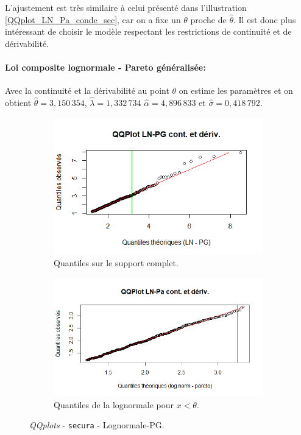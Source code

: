 		L'ajustement est très similaire à celui présenté dans l'illustration \ref{QQplot_LN_Pa_conde_sec}, car on a fixe un $\theta$ proche de $\hat{\theta}$. Il est donc plus intéressant de choisir le modèle respectant les restrictions de continuité et de dérivabilité.  	

		\paragraph{Loi composite lognormale - Pareto généralisée:} Avec la continuité et la dérivabilité au point $\theta$ on estime les paramètres et on obtient $\hat{\theta} =3,150\,354$, $\hat{\lambda}=1,332\,734$ $\hat{\alpha} =4,896\,833 $ et $\hat{\sigma}= 0,418\,792$.
		\begin{figure}[H]
			\begin{center}
				\begin{subfigure}[b]{0.45\textwidth}
					\includegraphics[scale=0.65]{Graphiques/QQ_LN_PG_condev_Secura} 
					\caption{Quantiles sur le support complet.} \label{QQplot_LN_PG_conde_Sec}
				\end{subfigure}
				\begin{subfigure}[b]{0.4\textwidth}
					\includegraphics[scale=0.65]{Graphiques/QQ_LN_PA_contdiv_t1_Secura} 
					\caption{Quantiles de la lognormale pour $x<\theta$.} \label{QQplot_LN_PG_conde_2_Sec}
				\end{subfigure}
				\renewcommand{\figurename}{Illustration}
				\caption{\textit{QQplots} - \texttt{secura} - Lognormale-PG.}\label{QQplot_LN_PG_conde_Sec3}
			\end{center}
		\end{figure}
		
